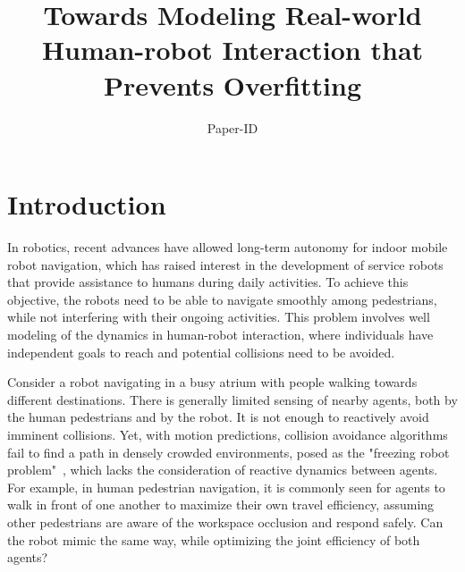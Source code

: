 \documentclass[conference]{IEEEtran}
\begin{document}
\title{Towards Modeling Real-world Human-robot Interaction that Prevents Overfitting}

\author{Paper-ID}



\maketitle


\IEEEpeerreviewmaketitle


\section{Introduction}
\vspace{-0.3em}
\label{sec:intro}
\noindent
In robotics, recent advances have allowed long-term autonomy for indoor mobile 
robot navigation, which has raised interest in the development of service 
robots that provide assistance to humans during daily activities. To achieve 
this objective, the robots need to be able to navigate smoothly among pedestrians, while 
not interfering with their ongoing activities. This problem involves well 
modeling of the dynamics in human-robot interaction, where individuals have 
independent goals to reach and potential collisions need to be avoided. 

Consider a robot navigating in a busy atrium with people walking towards 
different destinations. There is generally limited sensing of nearby agents, 
both by the human pedestrians and by the robot. It is not enough to reactively 
avoid imminent collisions. Yet,  
with motion predictions, collision avoidance algorithms fail to find a path in 
densely crowded environments, posed as the "freezing robot 
problem"~\cite{trautman2010unfreezing}, which lacks the consideration of reactive 
dynamics between agents. For example, in human pedestrian 
navigation, it is commonly seen for agents to walk in front of one 
another to maximize their own travel efficiency, assuming other pedestrians 
are aware of the workspace occlusion and respond safely. Can the robot mimic 
the same way, while optimizing the joint efficiency of both agents?  
\end{document}
